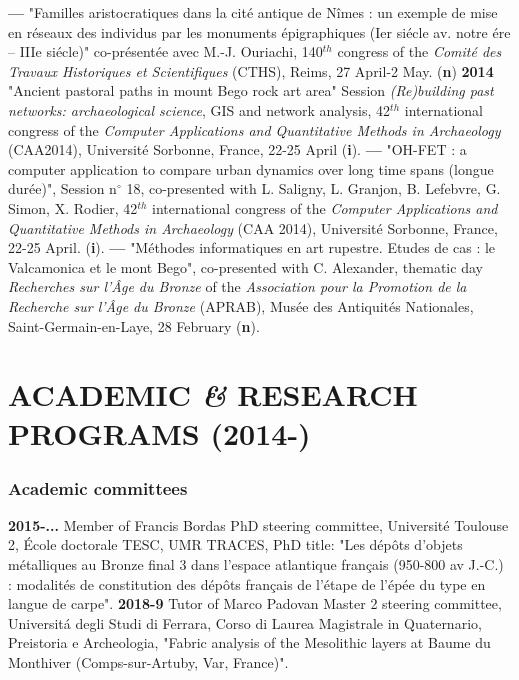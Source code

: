 \documentclass{article}
\begin{document}
\smallbreak
\textbf{--- }"Familles aristocratiques dans la cit\'{e} antique de N\^{i}mes : un exemple de mise en r\'{e}seaux des individus par les monuments \'{e}pigraphiques (Ier si\'{e}cle av. notre \'{e}re -- IIIe si\'{e}cle)" co-pr\'{e}sent\'{e}e avec M.-J. Ouriachi, 140${}^{th}$ congress of the \textit{Comit\'{e} des Travaux Historiques et Scientifiques} (CTHS), Reims, 27 April-2 May. (\textbf{n})
\smallbreak
\textbf{2014 }"Ancient pastoral paths in mount Bego rock art area" Session \textit{(Re)building past networks: archaeological science}, GIS and network analysis, 42${}^{th}$ international congress of the \textit{Computer Applications and Quantitative Methods in Archaeology} (CAA2014), Universit\'{e} Sorbonne, France, 22-25 April (\textbf{i}).
\smallbreak
\textbf{--- }"OH-FET : a computer application to compare urban dynamics over long time spans (longue dur\'{e}e)", Session n$\mathrm{{}^\circ}$ 18, co-presented with L. Saligny, L. Granjon, B. Lefebvre, G. Simon, X. Rodier, 42${}^{th}$ international congress of the \textit{Computer Applications and Quantitative Methods in Archaeology} (CAA 2014), Universit\'{e} Sorbonne, France, 22-25 April. (\textbf{i}).
\smallbreak
\textbf{--- }"M\'{e}thodes informatiques en art rupestre. Etudes de cas : le Valcamonica et le mont Bego", co-presented with C. Alexander, thematic day \textit{Recherches sur l'\^{A}ge du Bronze }of the\textit{ Association pour la Promotion de la Recherche sur l'\^{A}ge du Bronze }(APRAB), Mus\'{e}e des Antiquit\'{e}s Nationales, Saint-Germain-en-Laye, 28 February (\textbf{n}).

\section{ACADEMIC \textit{\&} RESEARCH PROGRAMS (2014-)}

\subsubsection*{Academic committees}

\textbf{2015-... }Member of Francis Bordas PhD steering committee, Universit\'{e} Toulouse 2, \'{E}cole doctorale TESC, UMR TRACES, PhD title: "Les d\'{e}p\^{o}ts d'objets m\'{e}talliques au Bronze final 3 dans l'espace atlantique fran\c{c}ais (950-800 av J.-C.) : modalit\'{e}s de constitution des d\'{e}p\^{o}ts fran\c{c}ais de l'\'{e}tape de l'\'{e}p\'{e}e du type en langue de carpe".
\smallbreak
\textbf{2018-9 }Tutor of Marco Padovan Master 2 steering committee, Universit\'{a} degli Studi di Ferrara, Corso di Laurea Magistrale in Quaternario, Preistoria e Archeologia, "Fabric analysis of the Mesolithic layers at Baume du Monthiver (Comps-sur-Artuby, Var, France)".
\end{document}
